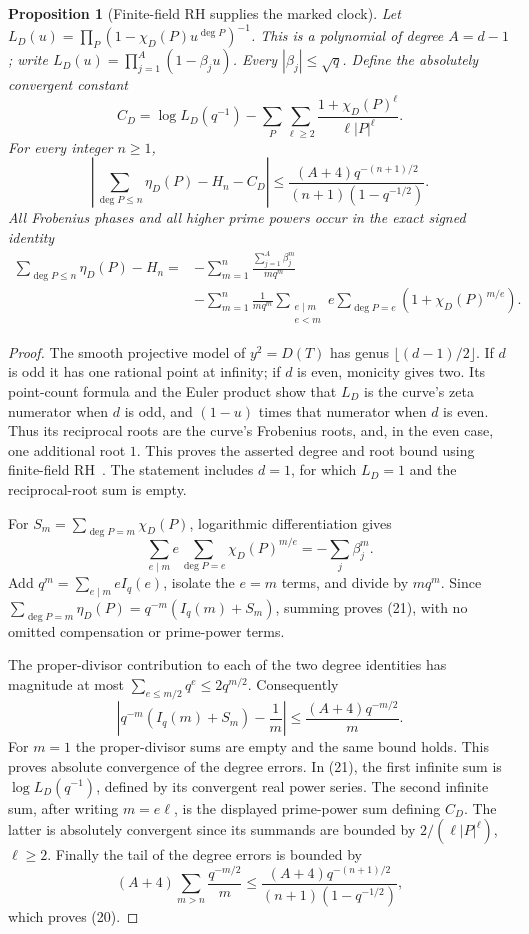\documentclass[11pt]{article}
\newtheorem{proposition}[theorem]{Proposition}
\begin{document}
\begin{proposition}[Finite-field RH supplies the marked clock]
\label{prop:markedClock}
Let \(L_D(u)=\prod_P(1-\chi_D(P)u^{\deg P})^{-1}\).
This is a polynomial of degree \(A=d-1\); write
\(L_D(u)=\prod_{j=1}^{A}(1-\beta_j u)\).
Every \(|\beta_j|\leq\sqrt q\). Define the absolutely convergent constant
\[
 C_D=\log L_D(q^{-1})-
       \sum_P\sum_{\ell\geq2}
         \frac{1+\chi_D(P)^\ell}{\ell |P|^\ell}.
\]
For every integer \(n\geq1\),
\[
 \left|\sum_{\deg P\leq n}\eta_D(P)-H_n-C_D\right|
 \leq \frac{(A+4)q^{-(n+1)/2}}
              {(n+1)(1-q^{-1/2})}.                \tag{20}
\]
All Frobenius phases and all higher prime powers occur in the exact
signed identity
\[
\begin{split}
 \sum_{\deg P\leq n}\eta_D(P)-H_n
 ={}&-\sum_{m=1}^n\frac{\sum_{j=1}^{A}\beta_j^m}{m q^m}\\
 &-\sum_{m=1}^n\frac1{m q^m}
     \sum_{\substack{e\mid m\\e<m}}e
          \sum_{\deg P=e}(1+\chi_D(P)^{m/e}).
\end{split}\tag{21}
\]
\end{proposition}
\begin{proof}
The smooth projective model of \(y^2=D(T)\) has genus
\(\lfloor(d-1)/2\rfloor\). If \(d\) is odd it has one rational
point at infinity; if \(d\) is even, monicity gives two. Its point-count
formula and the Euler product show that \(L_D\) is the curve's
zeta numerator when \(d\) is odd, and \((1-u)\) times that numerator
when \(d\) is even. Thus its reciprocal roots are the curve's
Frobenius roots, and, in the even case, one additional root \(1\).
This proves the asserted degree and root bound using
finite-field RH~\cite{Milne}. The statement includes \(d=1\), for which
\(L_D=1\) and the reciprocal-root sum is empty.

For \(S_m=\sum_{\deg P=m}\chi_D(P)\), logarithmic differentiation gives
\[
 \sum_{e\mid m}e\sum_{\deg P=e}\chi_D(P)^{m/e}
      =-\sum_j\beta_j^m.
\]
Add \(q^m=\sum_{e\mid m}eI_q(e)\), isolate the \(e=m\) terms,
and divide by \(m q^m\). Since
\(\sum_{\deg P=m}\eta_D(P)=q^{-m}(I_q(m)+S_m)\),
summing proves (21), with no omitted compensation or prime-power terms.

The proper-divisor contribution to each of the two degree identities
has magnitude at most
\(\sum_{e\leq m/2}q^e\leq2q^{m/2}\).
Consequently
\[
 \left|q^{-m}(I_q(m)+S_m)-\frac1m\right|
       \leq\frac{(A+4)q^{-m/2}}m.
\]
For \(m=1\) the proper-divisor sums are empty and the same bound holds.
This proves absolute convergence of the degree errors. In (21), the
first infinite sum is \(\log L_D(q^{-1})\), defined by its convergent
real power series. The second infinite sum, after writing \(m=e\ell\),
is the displayed prime-power sum defining \(C_D\).
The latter is absolutely convergent since its summands are bounded
by \(2/(\ell |P|^\ell)\), \(\ell\geq2\).
Finally the tail of the degree errors is bounded by
\[
 (A+4)\sum_{m>n}\frac{q^{-m/2}}m
 \leq\frac{(A+4)q^{-(n+1)/2}}{(n+1)(1-q^{-1/2})},
\]
which proves (20).
\end{proof}
\end{document}
